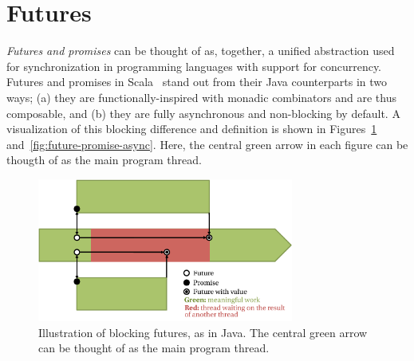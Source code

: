 %
%
%

\section{Futures}
\label{sec:futures}

{\em Futures and promises} can be thought of as, together, a unified abstraction
used for synchronization in programming languages with support for concurrency.
Futures and promises in Scala~\cite{Futures} stand out from their Java
counterparts in two ways; (a) they are functionally-inspired with monadic
combinators and are thus composable, and (b) they are fully asynchronous and
non-blocking by default. A visualization of this blocking difference and
definition is shown in Figures~\ref{fig:future-promise-blocking}
and~\ref{fig:future-promise-async}. Here, the central green arrow in each figure
can be thougth of as the main program thread.

\begin{figure}[!t]
\centering
\includegraphics[width=0.75\textwidth]{images/future-promise-basic-async-blocking}
\caption{Illustration of blocking futures, as in Java. The central green arrow can be thought of as the main program thread.}
\label{fig:future-promise-blocking}
\end{figure}

